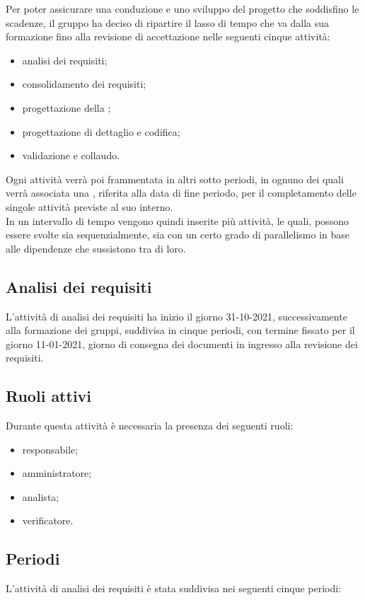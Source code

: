 Per poter assicurare una conduzione e uno sviluppo del progetto che soddisfino le scadenze, il gruppo ha deciso di ripartire il lasso di tempo che va dalla sua formazione fino alla revisione di accettazione nelle seguenti cinque attività: 

\begin{itemize} 
	\item analisi dei requisiti; 
	\item consolidamento dei requisiti; 
	\item progettazione della ; 
	\item progettazione di dettaglio e codifica; 
	\item validazione e collaudo. 
\end{itemize}	 
Ogni attività verrà poi frammentata in altri sotto periodi, in ognuno dei quali verrà associata una , 
riferita alla data di fine periodo, per il completamento delle singole attività previste al suo interno.\\ 
In un intervallo di tempo vengono quindi inserite più attività, le quali, possono essere svolte sia sequenzialmente, sia con un certo grado di parallelismo in base alle dipendenze che sussistono tra di loro. 

\subsection{Analisi dei requisiti} 
L’attività di analisi dei requisiti ha inizio il giorno 31-10-2021, successivamente alla formazione dei gruppi, suddivisa in cinque periodi, con termine fissato per il giorno 11-01-2021, giorno di consegna dei documenti in ingresso alla revisione dei requisiti. 

\subsection{Ruoli attivi} 
Durante questa attività è necessaria la presenza dei seguenti ruoli: 
\begin{itemize} 
	\item responsabile; 
	\item amministratore; 
	\item analista; 
	\item verificatore. 
\end{itemize} 

\subsection{Periodi} 
L'attività di analisi dei requisiti è stata suddivisa nei seguenti cinque periodi: 

